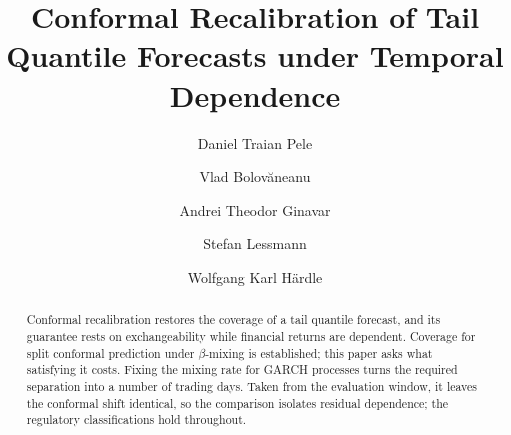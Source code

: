 \documentclass[preprint,11pt,authoryear]{elsarticle}
\newcommand{\1}{\boldsymbol{1}}
\begin{document}
	
	\begin{frontmatter}
		
\title{Conformal Recalibration of Tail Quantile Forecasts under Temporal Dependence}

		\author[1,2,3]{Daniel Traian Pele}
		
		\author[1]{Vlad Bolov\u{a}neanu}
		
		\author[1,3]{Andrei Theodor Ginavar}
		
		
		\author[1,4]{Stefan Lessmann}
		
		\author[1,3,4,5,6]{Wolfgang Karl H{\"a}rdle}
		
		
		
		
		
		
\begin{abstract}

Conformal recalibration restores the coverage of a tail quantile forecast, and
its guarantee rests on exchangeability while financial returns are dependent.
Coverage for split conformal prediction under $\beta$-mixing is established;
this paper asks what satisfying it costs. Fixing the mixing rate for GARCH
processes turns the required separation into a number of trading days. Taken
from the evaluation window, it leaves the conformal shift identical, so the
comparison isolates residual dependence; the regulatory classifications hold
throughout.


\end{abstract}
\end{frontmatter}
\end{document}
